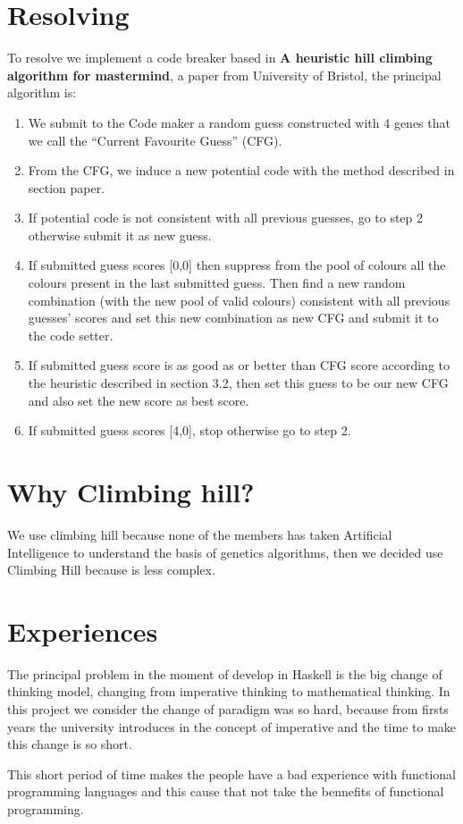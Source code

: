 \documentclass[a4paper,11pt]{book}
\begin{document}
\section{Resolving}
To resolve we implement a code breaker based in \textbf{
A heuristic hill climbing algorithm for mastermind}, a paper from University of Bristol, the principal algorithm is: 
 \begin{enumerate}
 	\item We submit to the Code maker a random guess
 	constructed with 4 genes that we call the “Current
 	Favourite Guess” (CFG).
 	\item From the CFG, we induce a new potential code
 	with the method described in section paper.
 	\item If potential code is not consistent with all previous
 	guesses, go to step 2 otherwise submit it as new
 	guess.
 	\item If submitted guess scores [0,0] then suppress from
 	the pool of colours all the colours present in the last
 	submitted guess. Then find a new random
 	combination (with the new pool of valid colours)
 	consistent with all previous guesses’ scores and set
 	this new combination as new CFG and submit it to
 	the code setter.
 	\item If submitted guess score is as good as or better
 	than CFG score according to the heuristic described
 	in section 3.2, then set this guess to be our new CFG
 	and also set the new score as best score.
 	\item If submitted guess scores [4,0], stop otherwise go
 	to step 2.
 \end{enumerate}

\section{Why Climbing hill?}
We use climbing hill because none of the members has taken Artificial Intelligence to understand the basis of genetics algorithms, then we decided use Climbing Hill because is less complex.

\section{Experiences}
The principal problem in the moment of develop in Haskell is the big change of thinking model, changing from imperative thinking to mathematical thinking. In this project we consider the change of paradigm was so hard, because from firsts years the university introduces in the concept of imperative and the time to make this change is so short. 

This short period of time makes the people have a bad experience with functional programming languages and this cause that not take the bennefits of functional programming.
\end{document}
